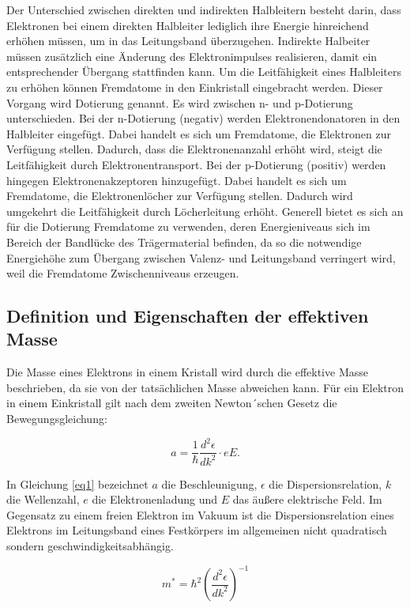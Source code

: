 Der Unterschied zwischen direkten und indirekten Halbleitern besteht darin, dass Elektronen 
bei einem direkten Halbleiter lediglich ihre Energie hinreichend erhöhen müssen, um in 
das Leitungsband überzugehen. Indirekte Halbeiter müssen zusätzlich eine Änderung 
des Elektronimpulses realisieren, damit ein entsprechender Übergang stattfinden kann.
Um die Leitfähigkeit eines Halbleiters zu erhöhen können Fremdatome in den Einkristall 
eingebracht werden. Dieser Vorgang wird Dotierung genannt.
Es wird zwischen n- und p-Dotierung unterschieden. Bei der n-Dotierung (negativ) werden 
Elektronendonatoren in den Halbleiter eingefügt. Dabei handelt es sich um Fremdatome, die
Elektronen zur Verfügung stellen. Dadurch, dass die Elektronenanzahl erhöht wird, 
steigt die Leitfähigkeit durch Elektronentransport.
Bei der p-Dotierung (positiv) werden hingegen Elektronenakzeptoren hinzugefügt. 
Dabei handelt es sich um Fremdatome, die Elektronenlöcher zur Verfügung stellen. 
Dadurch wird umgekehrt die Leitfähigkeit durch Löcherleitung erhöht. 
Generell bietet es sich an für die Dotierung Fremdatome zu verwenden, deren 
Energieniveaus sich im Bereich der Bandlücke des Trägermaterial befinden, da so die 
notwendige Energiehöhe zum Übergang zwischen Valenz- und Leitungsband verringert wird, 
weil die Fremdatome Zwischenniveaus erzeugen.

\subsection{Definition und Eigenschaften der effektiven Masse}
Die Masse eines Elektrons in einem Kristall wird durch die effektive Masse beschrieben, 
da sie von der tatsächlichen Masse abweichen kann. 
Für ein Elektron in einem Einkristall gilt nach dem zweiten Newton´schen Gesetz die 
Bewegungsgleichung:

\begin{equation}
    a = \frac{1}{\hbar} \frac{d^2\epsilon}{dk^2}\cdot eE.
    \label{eq1}
\end{equation}

In Gleichung \ref{eq1} bezeichnet $a$ die Beschleunigung, $\epsilon$ die 
Dispersionsrelation, $k$ die Wellenzahl, $e$ die Elektronenladung und $E$ das
äußere elektrische Feld.
Im Gegensatz zu einem freien Elektron im Vakuum ist die Dispersionsrelation eines 
Elektrons im Leitungsband eines Festkörpers im allgemeinen nicht quadratisch
sondern geschwindigkeitsabhängig. 

\begin{equation}
    m^* = \hbar^2 \left( \frac{d^2\epsilon}{dk^2} \right)^{-1}
    \label{eq2}
\end{equation}

